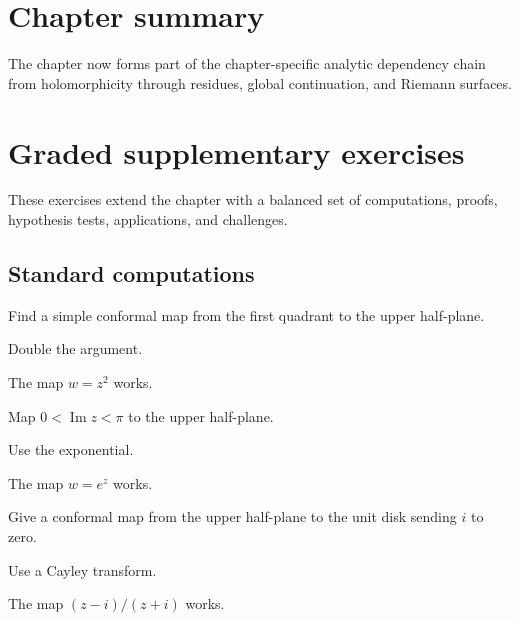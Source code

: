\section*{Chapter summary}
The chapter now forms part of the chapter-specific analytic dependency chain from holomorphicity through residues, global continuation, and Riemann surfaces.
\section{Graded supplementary exercises}
These exercises extend the chapter with a balanced set of computations, proofs, hypothesis tests, applications, and challenges.

\subsection*{Standard computations}

\begin{exercise}\label{exr:iv17-expand-01}
Find a simple conformal map from the first quadrant to the upper half-plane.
\end{exercise}
\begin{hint}
Double the argument.
\end{hint}
\begin{solution}
The map \(w=z^2\) works.
\end{solution}

\begin{exercise}\label{exr:iv17-expand-02}
Map \(0<\operatorname{Im}z<\pi\) to the upper half-plane.
\end{exercise}
\begin{hint}
Use the exponential.
\end{hint}
\begin{solution}
The map \(w=e^z\) works.
\end{solution}

\begin{exercise}\label{exr:iv17-expand-03}
Give a conformal map from the upper half-plane to the unit disk sending \(i\) to zero.
\end{exercise}
\begin{hint}
Use a Cayley transform.
\end{hint}
\begin{solution}
The map \((z-i)/(z+i)\) works.
\end{solution}

